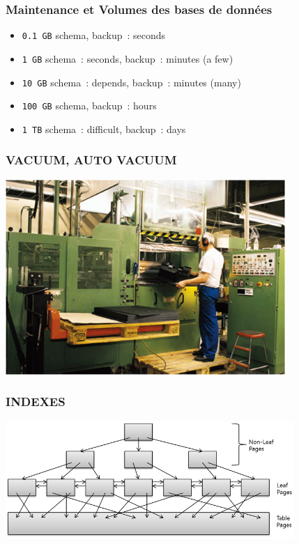\documentclass{beamer}
\begin{document}
\begin{frame}[fragile]
\begin{center}
  \frametitle{Maintenance et Volumes des bases de données}


  \begin{itemize}
  \item \texttt{0.1 GB} schema, backup : seconds
  \item \texttt{1 GB} schema : seconds, backup : minutes (a few)
  \item \texttt{10 GB} schema : depends, backup : minutes (many)
  \item \texttt{100 GB} schema, backup : hours
  \item \texttt{1 TB} schema : difficult, backup : days
  \end{itemize}
\end{center}
\end{frame}

\begin{frame}[fragile]
\begin{center}
  \frametitle{VACUUM, AUTO VACUUM}
  \includegraphics[height=20em]{VacuumForming.jpg}
\end{center}
\end{frame}

\begin{frame}[fragile]
\begin{center}
  \frametitle{INDEXES}
  \includegraphics[height=12em]{b+tree-structure.png}
\end{center}
\end{frame}
\end{document}
